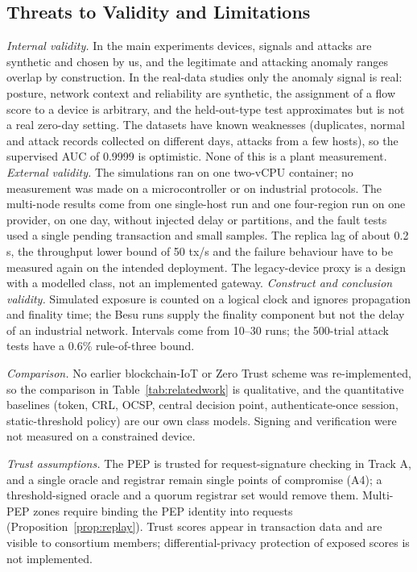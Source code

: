 \subsection{Threats to Validity and Limitations}
\emph{Internal validity.} In the main experiments devices, signals and attacks are synthetic and chosen by us, and the legitimate and attacking anomaly ranges overlap by construction. In the real-data studies only the anomaly signal is real: posture, network context and reliability are synthetic, the assignment of a flow score to a device is arbitrary, and the held-out-type test approximates but is not a real zero-day setting. The datasets have known weaknesses (duplicates, normal and attack records collected on different days, attacks from a few hosts), so the supervised AUC of 0.9999 is optimistic. None of this is a plant measurement. \emph{External validity.} The simulations ran on one two-vCPU container; no measurement was made on a microcontroller or on industrial protocols. The multi-node results come from one single-host run and one four-region run on one provider, on one day, without injected delay or partitions, and the fault tests used a single pending transaction and small samples. The replica lag of about 0.2\,s, the throughput lower bound of 50 tx/s and the failure behaviour have to be measured again on the intended deployment. The legacy-device proxy is a design with a modelled class, not an implemented gateway. \emph{Construct and conclusion validity.} Simulated exposure is counted on a logical clock and ignores propagation and finality time; the Besu runs supply the finality component but not the delay of an industrial network. Intervals come from 10--30 runs; the 500-trial attack tests have a 0.6\% rule-of-three bound.

\emph{Comparison.} No earlier blockchain-IoT or Zero Trust scheme was re-implemented, so the comparison in Table~\ref{tab:relatedwork} is qualitative, and the quantitative baselines (token, CRL, OCSP, central decision point, authenticate-once session, static-threshold policy) are our own class models. Signing and verification were not measured on a constrained device.

\emph{Trust assumptions.} The PEP is trusted for request-signature checking in Track A, and a single oracle and registrar remain single points of compromise (A4); a threshold-signed oracle \cite{hassan2023oracle} and a quorum registrar set would remove them. Multi-PEP zones require binding the PEP identity into requests (Proposition~\ref{prop:replay}). Trust scores appear in transaction data and are visible to consortium members; differential-privacy protection of exposed scores \cite{ren2026ditdp} is not implemented.

